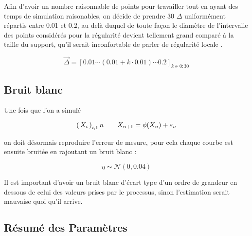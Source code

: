 Afin d'avoir un nombre raisonnable de points pour travailler tout en ayant des temps de simulation raisonables, on décide de prendre 30 $\Delta$ uniformément répartis entre 0.01 et 0.2, au delà duquel de toute façon le diamètre de l'intervalle des points considérés pour la régularité devient tellement grand comparé à la taille du support, qu'il serait inconfortable de parler de \og régularité locale \fg.

$$
	\vec \Delta = [ 0.01 \cdots (0.01 + k\cdot0.01)\cdots 0.2 ]_{k \in 0:30}
$$

\subsection{Bruit blanc}


Une fois que l'on a simulé

$$
	\left( \, {X} _ {i} \, \right)_{i, 1} n \quad\quad X_{n+1} = \phi(X_n) + \varepsilon_n
$$

on doit désormais reproduire l'erreur de mesure, pour cela chaque courbe est ensuite bruitée en rajoutant un bruit blanc :

$$
	\eta \sim \mathcal N ( 0, 0.04 )
$$

Il est important d'avoir un bruit blanc d'écart type d'un ordre de grandeur en dessous de celui des valeurs prises par le processus, sinon l'estimation serait mauvaise quoi qu'il arrive.


\subsection{Résumé des Paramètres}

